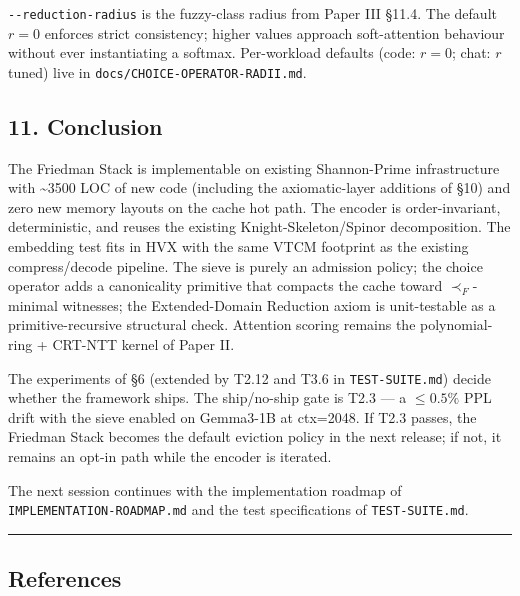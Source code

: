 \documentclass[
  11pt,
]{article}
\begin{document}
\texttt{-\/-reduction-radius} is the fuzzy-class radius from Paper III
§11.4. The default \(r = 0\) enforces strict consistency; higher values
approach soft-attention behaviour without ever instantiating a softmax.
Per-workload defaults (code: \(r=0\); chat: \(r\) tuned) live in
\texttt{docs/CHOICE-OPERATOR-RADII.md}.

\hypertarget{conclusion}{%
\subsection{11. Conclusion}\label{conclusion}}

The Friedman Stack is implementable on existing Shannon-Prime
infrastructure with \textasciitilde3500 LOC of new code (including the
axiomatic-layer additions of §10) and zero new memory layouts on the
cache hot path. The encoder is order-invariant, deterministic, and
reuses the existing Knight-Skeleton/Spinor decomposition. The embedding
test fits in HVX with the same VTCM footprint as the existing
compress/decode pipeline. The sieve is purely an admission policy; the
choice operator adds a canonicality primitive that compacts the cache
toward \(\prec_F\)-minimal witnesses; the Extended-Domain Reduction
axiom is unit-testable as a primitive-recursive structural check.
Attention scoring remains the polynomial-ring + CRT-NTT kernel of Paper
II.

The experiments of §6 (extended by T2.12 and T3.6 in
\texttt{TEST-SUITE.md}) decide whether the framework ships. The
ship/no-ship gate is T2.3 --- a \(\le 0.5\%\) PPL drift with the sieve
enabled on Gemma3-1B at ctx=2048. If T2.3 passes, the Friedman Stack
becomes the default eviction policy in the next release; if not, it
remains an opt-in path while the encoder is iterated.

The next session continues with the implementation roadmap of
\texttt{IMPLEMENTATION-ROADMAP.md} and the test specifications of
\texttt{TEST-SUITE.md}.

\begin{center}\rule{0.5\linewidth}{0.5pt}\end{center}

\hypertarget{references}{%
\subsection{References}\label{references}}
\end{document}
